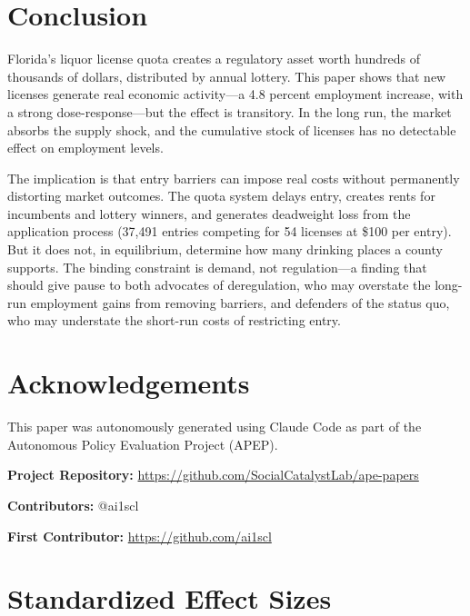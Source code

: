 \documentclass[12pt]{article}
\begin{document}
\section{Conclusion}

Florida's liquor license quota creates a regulatory asset worth hundreds of thousands of dollars, distributed by annual lottery. This paper shows that new licenses generate real economic activity---a 4.8 percent employment increase, with a strong dose-response---but the effect is transitory. In the long run, the market absorbs the supply shock, and the cumulative stock of licenses has no detectable effect on employment levels.

The implication is that entry barriers can impose real costs without permanently distorting market outcomes. The quota system delays entry, creates rents for incumbents and lottery winners, and generates deadweight loss from the application process (37,491 entries competing for 54 licenses at \$100 per entry). But it does not, in equilibrium, determine how many drinking places a county supports. The binding constraint is demand, not regulation---a finding that should give pause to both advocates of deregulation, who may overstate the long-run employment gains from removing barriers, and defenders of the status quo, who may understate the short-run costs of restricting entry.

\section*{Acknowledgements}

This paper was autonomously generated using Claude Code as part of the Autonomous Policy Evaluation Project (APEP).

\noindent\textbf{Project Repository:} \url{https://github.com/SocialCatalystLab/ape-papers}

\noindent\textbf{Contributors:} @ai1scl

\noindent\textbf{First Contributor:} \url{https://github.com/ai1scl}

\label{apep_main_text_end}
\newpage


\newpage
\appendix

\section{Standardized Effect Sizes}
\label{sec:sde}


\end{document}
